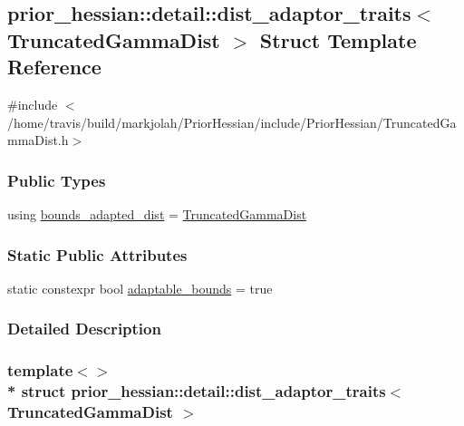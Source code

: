 \hypertarget{structprior__hessian_1_1detail_1_1dist__adaptor__traits_3_01TruncatedGammaDist_01_4}{}\subsection{prior\+\_\+hessian\+:\+:detail\+:\+:dist\+\_\+adaptor\+\_\+traits$<$ Truncated\+Gamma\+Dist $>$ Struct Template Reference}
\label{structprior__hessian_1_1detail_1_1dist__adaptor__traits_3_01TruncatedGammaDist_01_4}


{\ttfamily \#include $<$/home/travis/build/markjolah/\+Prior\+Hessian/include/\+Prior\+Hessian/\+Truncated\+Gamma\+Dist.\+h$>$}

\subsubsection*{Public Types}
\begin{DoxyCompactItemize}
\item 
using \hyperlink{structprior__hessian_1_1detail_1_1dist__adaptor__traits_3_01TruncatedGammaDist_01_4_a8bf24f31586d1711db6d94be55d00e44}{bounds\+\_\+adapted\+\_\+dist} = \hyperlink{namespaceprior__hessian_acd158ecf6698fbe5a4430df7730d3aba}{Truncated\+Gamma\+Dist}
\end{DoxyCompactItemize}
\subsubsection*{Static Public Attributes}
\begin{DoxyCompactItemize}
\item 
static constexpr bool \hyperlink{structprior__hessian_1_1detail_1_1dist__adaptor__traits_3_01TruncatedGammaDist_01_4_a302fc7ace5815b5946b1153da7805072}{adaptable\+\_\+bounds} = true
\end{DoxyCompactItemize}


\subsubsection{Detailed Description}
\subsubsection*{template$<$$>$\\*
struct prior\+\_\+hessian\+::detail\+::dist\+\_\+adaptor\+\_\+traits$<$ Truncated\+Gamma\+Dist $>$}




